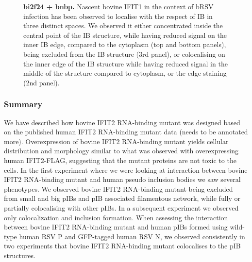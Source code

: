 \begin{figure}
\begin{subfigure}{1\textwidth}
    \end{subfigure}
    \caption[bi2f24 + bnbp]{\textbf{bi2f24 + bnbp.} Nascent bovine IFIT1 in the context of bRSV infection has been observed to localise with the respect of IB in three distinct spaces. We observed it either concentrated inside the central point of the IB structure, while having reduced signal on the inner IB edge, compared to the cytoplasm (top and bottom panels), being excluded from the IB structure (3rd panel), or colocalising on the inner edge of the IB structure while having reduced signal in the middle of the structure compared to cytoplasm, or the edge staining (2nd panel).}
    \label{fig:bi2f24 + bnbp}
\end{figure}

\subsubsection{Summary}
We have described how bovine IFIT2 RNA-binding mutant was designed based on the published human IFIT2 RNA-binding mutant data (needs to be annotated more). Overexpression of bovine IFIT2 RNA-binding mutant yields cellular distribution and morphology similar to what was observed with overexpressing human IFIT2-FLAG, suggesting that the mutant proteins are not toxic to the cells. In the first experiment where we were looking at interaction between bovine IFIT2 RNA-binding mutant and human pseudo inclusion bodies we saw several phenotypes. We observed bovine IFIT2 RNA-binding mutant being excluded from small and big pIBs and pIB associated filamentous network, while fully or partially colocalising with other pIBs. In a subsequent experiment we observed only colocalization and inclusion formation. When assessing the interaction between bovine IFIT2 RNA-binding mutant and human pIBs formed using wild-type human RSV P and GFP-tagged human RSV N, we observed consistently in two experiments that bovine IFIT2 RNA-binding mutant colocalises to the pIB structures.
